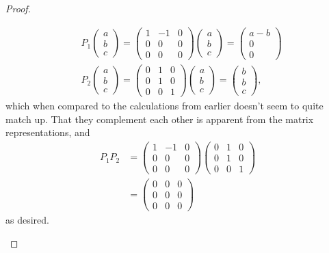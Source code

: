 \documentclass[12pt]{article}
\theoremstyle{definition}
\begin{document}
\begin{proof}
\begin{enumerate}[label=(\alph*)]
\begin{align*}
            & P_1 \begin{pmatrix}a \\ b \\ c\end{pmatrix} = \begin{pmatrix}1 & -1 & 0 \\ 0 & 0 & 0 \\ 0 & 0 & 0\end{pmatrix}\begin{pmatrix}a \\ b \\ c\end{pmatrix} = \begin{pmatrix}a - b \\ 0 \\ 0\end{pmatrix} \\
			       & P_2 \begin{pmatrix}a \\ b \\ c\end{pmatrix} = \begin{pmatrix}0 & 1 & 0 \\ 0 & 1 & 0 \\ 0 & 0 & 1\end{pmatrix}\begin{pmatrix}a \\ b \\ c\end{pmatrix} = \begin{pmatrix}b \\ b \\ c\end{pmatrix},
		      \end{align*}
          which when compared to the calculations from earlier doesn't seem to quite match up.
		      That they complement each other is apparent from the matrix representations, and \begin{align*}
			      P_1P_2 & = \begin{pmatrix}1 & -1 & 0\\0 & 0 & 0\\0 & 0 & 0\end{pmatrix}\begin{pmatrix}0 & 1 & 0 \\ 0 & 1 & 0 \\ 0 & 0 & 1\end{pmatrix} \\
			             & = \begin{pmatrix}0 & 0 & 0\\0 & 0 & 0\\0 & 0 & 0\end{pmatrix}
		      \end{align*}
		      as desired.
	\end{enumerate}
\end{proof}
\end{document}
